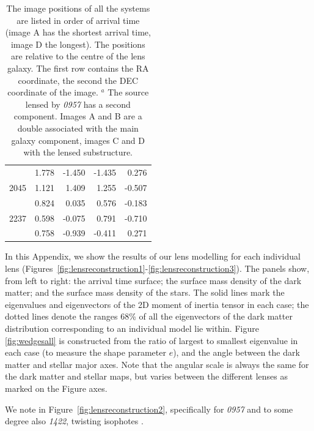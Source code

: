 \documentclass[useAMS,usenatbib]{mn2e}
\begin{document}
\begin{table}
\begin{center}
\begin{tabular}{l r r r r}
           & 1.778 & -1.450 & -1.435 & 0.276 \\
      2045 & 1.121 & 1.409 & 1.255 & -0.507 \\
           & 0.824 & 0.035 & 0.576 & -0.183 \\
      2237 & 0.598 & -0.075 & 0.791 & -0.710 \\
           & 0.758 & -0.939 & -0.411 & 0.271 \\
    \end{tabular}
    \caption[width=\linewidth]{The image positions of all the systems are listed in order of arrival time (image A has the shortest arrival time, image D the longest). The positions are relative to the centre of the lens galaxy. The first row contains the RA coordinate, the second the DEC coordinate of the image. \newline $^{a}$ The source lensed by {\it0957} has a second component. Images A and B are a double associated with the main galaxy component, images C and D with the lensed substructure.}
    \label{tab:lenspositions}
  \end{center}
\end{table}

In this Appendix, we show the results of our lens modelling for each individual lens (Figures~\ref{fig:lensreconstruction1}-\ref{fig:lensreconstruction3}). The panels show, from left to right: the arrival time surface; the surface mass density of the dark matter; and the surface mass density of the stars. The solid lines mark the eigenvalues and eigenvectors of the 2D moment of inertia tensor in each case; the dotted lines denote the ranges 68\% of all the eigenvectors of the dark matter distribution corresponding to an individual model lie within. Figure \ref{fig:wedgesall} is constructed from the ratio of largest to smallest eigenvalue in each case (to measure the shape parameter $e$), and the angle between the dark matter and stellar major axes. Note that the angular scale is always the same for the dark matter and stellar maps, but varies between the different lenses as marked on the Figure axes.

We note in Figure~\ref{fig:lensreconstruction2}, specifically for {\it0957} and to some degree also {\it1422}, twisting isophotes \citep[e.g.][]{1978ComAp...8...27B}.
\end{document}
